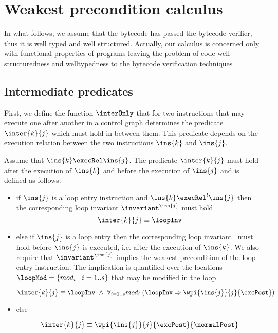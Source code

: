  






\section{Weakest precondition calculus} \label{wpRules}

In what follows, we assume that the bytecode has passed the bytecode verifier, thus it is well typed and well structured. Actually, our calculus is concerned only
with functional properties of programs leaving the problem of code well structuredness and welltypedness to the bytecode verification techniques 

\subsection{Intermediate predicates}
First, we define the function $\interOnly$ that for two instructions that may execute one 
after another in a control graph determines the predicate $\inter{k}{j}$ which must hold in between them.
This predicate depends on the execution relation between the two instructions $\ins{k}$ and $\ins{j}$.
 
\begin{defInter}\label{inter} 

Assume that $\ins{k} \execRel \ins{j}$. The predicate $\inter{k}{j}$ must hold after the execution of $\ins{k}$ and before the execution of 
$\ins{j}$ and is defined as follows:
\begin{itemize}
\item if $\ins{j}$ is a loop entry instruction and $\ins{k} \execRel^l \ins{j}$
then the corresponding loop invariant $ \invariant^{\ins{j}}$  must hold
$$
\inter{k}{j} \equiv  \loopInv
$$

\item else if $\ins{j}$ is a loop entry then the corresponding loop invariant \loopInv  \ must hold before $\ins{j}$ is executed, 
i.e. after the execution of $\ins{k}$. We also require that $\invariant^{\ins{j}}$ implies the weakest precondition of the loop entry instruction. 
The implication is quantified over the locations $ \loopMod = \{ mod_i \mid i= 1..s \} $ that may be modified in the loop

$$\inter{k}{j} \equiv \loopInv \ \wedge \ \forall_{i = 1..s} mod_i.(
\loopInv \Rightarrow \wpi{\ins{j}}{j}{ \excPost })$$

\item else 

$$\inter{k}{j} \equiv \wpi{ \ins{j} }{j}{\excPost}{\normalPost}$$
\end{itemize}
\end{defInter}



